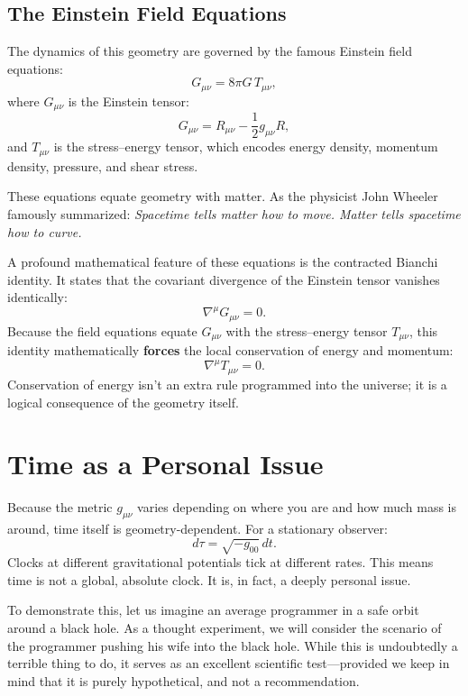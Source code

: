 \subsection*{The Einstein Field Equations}

The dynamics of this geometry are governed by the famous Einstein field equations:
\begin{equation}
G_{\mu\nu} = 8\pi G \, T_{\mu\nu},
\end{equation}
where $G_{\mu\nu}$ is the Einstein tensor:
\begin{equation}
G_{\mu\nu} = R_{\mu\nu} - \frac{1}{2} g_{\mu\nu} R,
\end{equation}
and $T_{\mu\nu}$ is the stress–energy tensor, which encodes energy density, momentum density, pressure, and shear stress.

These equations equate geometry with matter.
As the physicist John Wheeler famously summarized: \emph{Spacetime tells matter how to move. Matter tells spacetime how to curve.}

A profound mathematical feature of these equations is the contracted Bianchi identity.
It states that the covariant divergence of the Einstein tensor vanishes identically:
\begin{equation}
\nabla^\mu G_{\mu\nu} = 0.
\end{equation}
Because the field equations equate $G_{\mu\nu}$ with the stress–energy tensor $T_{\mu\nu}$, this identity mathematically \textbf{forces} the local conservation of energy and momentum:
\begin{equation}
\nabla^\mu T_{\mu\nu} = 0.
\end{equation}
Conservation of energy isn't an extra rule programmed into the universe; it is a logical consequence of the geometry itself.

\section{Time as a Personal Issue}

Because the metric $g_{\mu\nu}$ varies depending on where you are and how much mass is around, time itself is geometry-dependent.
For a stationary observer:
\begin{equation}
d\tau = \sqrt{-g_{00}} \, dt.
\end{equation}
Clocks at different gravitational potentials tick at different rates.
This means time is not a global, absolute clock.
It is, in fact, a deeply personal issue.

To demonstrate this, let us imagine an average programmer in a safe orbit around a black hole.
As a thought experiment, we will consider the scenario of the programmer pushing his wife into the black hole.
While this is undoubtedly a terrible thing to do, it serves as an excellent scientific test---provided we keep in mind that it is purely hypothetical, and not a recommendation.

